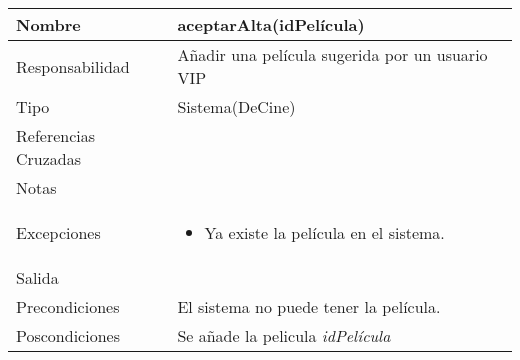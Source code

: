 \documentclass{article}
\begin{document}
\begin{table}[h]
\begin{tabular}{|l|l|l|l|l|l|}
\hline
\multicolumn{2}{|p{3cm}|}{Nombre} & \multicolumn{4}{p{10cm}|}{\textbf{aceptarAlta(idPelícula)}}\\
\hline
\multicolumn{2}{|p{3cm}|}{Responsabilidad} & \multicolumn{4}{p{10cm}|}{Añadir una película sugerida por un usuario VIP} \\
\hline
\multicolumn{2}{|p{3cm}|}{Tipo} & \multicolumn{4}{p{10cm}|}{Sistema(DeCine)} \\
\hline
\multicolumn{2}{|p{3cm}|}{Referencias Cruzadas} & \multicolumn{4}{p{10cm}|}{} \\
\hline
\multicolumn{2}{|p{3cm}|}{Notas} & \multicolumn{4}{p{10cm}|}{} \\
\hline
\multicolumn{2}{|p{3cm}|}{Excepciones} & \multicolumn{4}{p{10cm}|}{\begin{itemize}
\item Ya existe la película en el sistema.
\end{itemize}} \\
\hline
\multicolumn{2}{|p{3cm}|}{Salida} & \multicolumn{4}{p{10cm}|}{} \\
\hline
\multicolumn{2}{|p{3cm}|}{Precondiciones} & \multicolumn{4}{p{10cm}|}{El sistema no puede tener la película.} \\
\hline
\multicolumn{2}{|p{3cm}|}{Poscondiciones} & \multicolumn{4}{p{10cm}|}{Se añade la pelicula \textit{idPelícula}} \\
\hline
\end{tabular}
\end{table}
\end{document}
